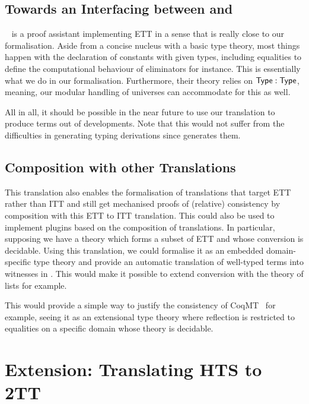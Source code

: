 \subsection{Towards an Interfacing between \Andromeda and \Coq}

\Andromeda~\cite{andromeda} is a proof assistant implementing ETT in a sense
that is really close to our formalisation. Aside from a concise nucleus with
a basic type theory, most things happen with the declaration of constants
with given types, including equalities to define the computational behaviour
of eliminators for instance.
This is essentially what we do in our formalisation.
Furthermore, their theory relies on $\mathsf{Type} : \mathsf{Type}$, meaning, our modular
handling of universes can accommodate for this as well.

All in all, it should be possible in the near future to use our translation
to produce \Coq terms out of \Andromeda developments.
%
Note that this would not suffer from the difficulties in generating typing
derivations since \Andromeda generates them.

\subsection{Composition with other Translations}

This translation also enables the formalisation of translations that
target ETT rather than ITT and still get mechanised proofs of (relative)
consistency by composition with this ETT to ITT translation.  This could
also be used to implement plugins based on the composition of
translations. In particular, supposing we have a theory which forms a
subset of ETT and whose conversion is decidable. Using this translation,
we could formalise it as an embedded domain-specific type theory and
provide an automatic translation of well-typed terms into witnesses in
\Coq. This would make it possible to extend conversion with the theory
of lists for example.

This would provide a simple way to justify the consistency of
CoqMT~\cite{DBLP:conf/lpar/JouannaudS17} for example, seeing it as an
extensional type theory where reflection is restricted to equalities
on a specific domain whose theory is decidable.


\section{Extension: Translating HTS to 2TT}
\label{sec:extens-transl-hts}

